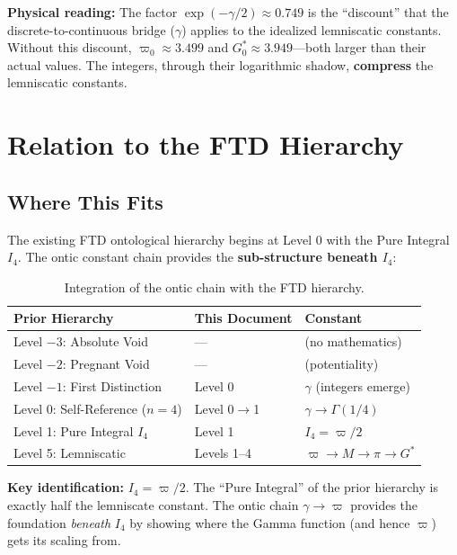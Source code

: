 \documentclass[11pt, letterpaper]{article}
\newcommand{\G}{G^*}
\theoremstyle{definition}
\theoremstyle{remark}
\begin{document}
\textbf{Physical reading:} The factor $\exp(-\gamma/2) \approx 0.749$ is the ``discount'' that the discrete-to-continuous bridge ($\gamma$) applies to the idealized lemniscatic constants. Without this discount, $\varpi_0 \approx 3.499$ and $\G_0 \approx 3.949$---both larger than their actual values. The integers, through their logarithmic shadow, \textbf{compress} the lemniscatic constants.

\section{Relation to the FTD Hierarchy}

\subsection{Where This Fits}

The existing FTD ontological hierarchy begins at Level 0 with the Pure Integral $I_4$. The ontic constant chain provides the \textbf{sub-structure beneath $I_4$}:

\begin{table}[h]
\centering
\begin{tabular}{@{}lll@{}}
\toprule
\textbf{Prior Hierarchy} & \textbf{This Document} & \textbf{Constant} \\
\midrule
Level $-3$: Absolute Void & --- & (no mathematics) \\
Level $-2$: Pregnant Void & --- & (potentiality) \\
Level $-1$: First Distinction & Level 0 & $\gamma$ (integers emerge) \\
Level 0: Self-Reference ($n=4$) & Level 0$\to$1 & $\gamma \to \Gamma(1/4)$ \\
Level 1: Pure Integral $I_4$ & Level 1 & $I_4 = \varpi/2$ \\
Level 5: Lemniscatic & Levels 1--4 & $\varpi \to M \to \pi \to \G$ \\
\bottomrule
\end{tabular}
\caption{Integration of the ontic chain with the FTD hierarchy.}
\end{table}

\noindent\textbf{Key identification:} $I_4 = \varpi/2$. The ``Pure Integral'' of the prior hierarchy is exactly half the lemniscate constant. The ontic chain $\gamma \to \varpi$ provides the foundation \textit{beneath} $I_4$ by showing where the Gamma function (and hence $\varpi$) gets its scaling from.
\end{document}
